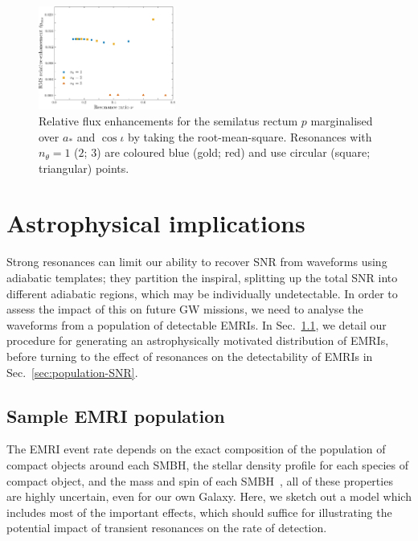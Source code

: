 \documentclass[aps,prd,amsfonts,amssymb,amsmath,nofootinbib,showpacs,superscriptaddress,twocolumn,floatfix]{revtex4-1}
\newcommand{\secref}[1]{Sec.~\ref{sec:#1}}
\begin{document}
\begin{figure}
\centering
\includegraphics[width=0.4\textwidth]{Fig_nu_rms_p}
\caption{\label{fig:res-flux-rms-p-vsnu}Relative flux enhancements for the semilatus rectum $p$ marginalised over $a_\ast$ and $\cos\iota$ by taking the root-mean-square. Resonances with $n_\theta = 1$ ($2$; $3$) are coloured blue (gold; red) and use circular (square; triangular) points.}
\end{figure}

\section{Astrophysical implications}
\label{sec:astrophysics}

Strong resonances can limit our ability to recover SNR from waveforms using adiabatic templates; they partition the inspiral, splitting up the total SNR into different adiabatic regions, which may be individually undetectable. In order to assess the impact of this on future GW missions, we need to analyse the waveforms from a population of detectable EMRIs. In \secref{EMRI-population}, we detail our procedure for generating an astrophysically motivated distribution of EMRIs, before turning to the effect of resonances on the detectability of EMRIs in \secref{population-SNR}.

\subsection{Sample EMRI population}
\label{sec:EMRI-population}

The EMRI event rate depends on the exact composition of the population of compact objects around each SMBH, the stellar density profile for each species of compact object, and the mass and spin of each SMBH~\cite{Alexander2005}, all of these properties are highly uncertain, even for our own Galaxy. Here, we sketch out a model which includes most of the important effects, which should suffice for illustrating the potential impact of transient resonances on the rate of detection.
\end{document}
